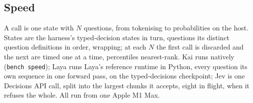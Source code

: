 \subsection{Speed}
\label{sec:speed}

A call is one state with $N$ questions, from tokenising to probabilities on
the host. States are the harness's typed-decision states in turn, questions its
distinct question definitions in order, wrapping; at each $N$ the first call is
discarded and the next are timed one at a time, percentiles nearest-rank.
Kai runs natively (\texttt{bench speed}); Laya runs Laya's reference runtime
in Python, every question its own sequence in one forward pass, on the
typed-decisions checkpoint; Jev is one Decisions API call, split into the
largest chunks it accepts, eight in flight, when it refuses the whole. All run
from one Apple M1 Max.

